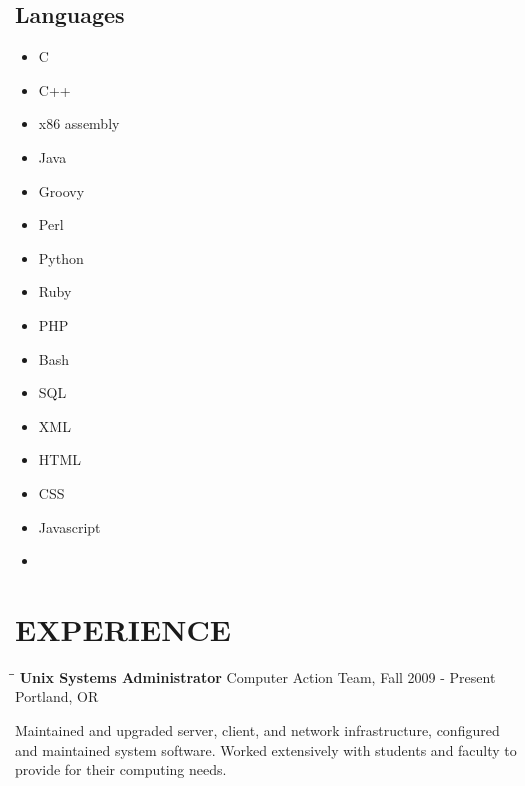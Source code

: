 \documentclass{res}
\begin{document}
\begin{resume}
\subsection{Languages}
\vspace{-0.2in}	

\begin{multicols}{4}
  \begin{itemize}
    \item C
    \item C++
    \item x86 assembly
    \item Java
    \item Groovy
    \item Perl
    \item Python
    \item Ruby
    \item PHP
    \item Bash
    \item SQL
    \item XML
    \item HTML
    \item CSS
    \item Javascript
    \item \LaTeXe
  \end{itemize}
\end{multicols}

\vspace{-0.25in}	

\section{EXPERIENCE}
  \vspace{-0.1in}	
  \begin{tabbing}
  \hspace{2.3in}\= \hspace{2.6in}\= \kill %
  {\bf Unix Systems Administrator} \>Computer Action Team, \>Fall 2009 - Present\\
			   \>Portland, OR
  \end{tabbing}\vspace{-20pt}      %
  Maintained and upgraded server, client, and network infrastructure, configured
  and maintained system software. Worked extensively with students and faculty to
  provide for their computing needs.

  \vspace{-0.21in}	


\end{resume}
\end{document}
